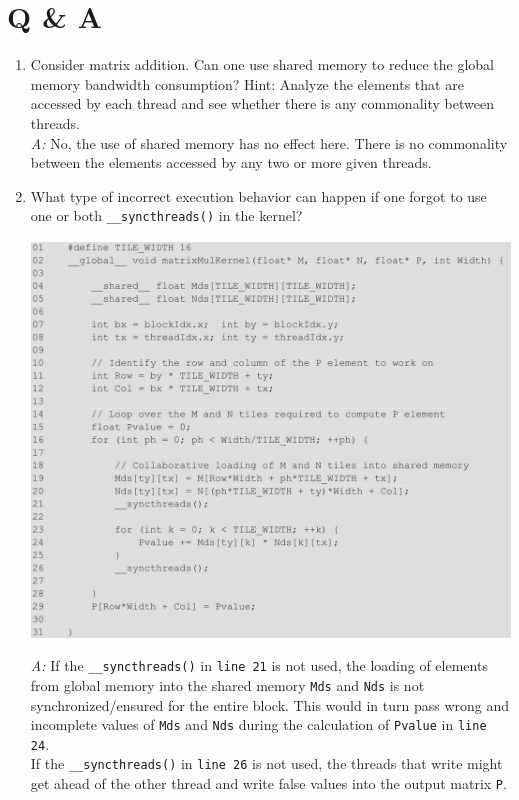 \section{Q \& A}
\begin{enumerate}
      \item Consider matrix addition. Can one use shared memory to reduce the global memory bandwidth consumption? Hint: Analyze the elements that are accessed by each thread and see whether there is any commonality between threads.
            \\ \textsl{A:} No, the use of shared memory has no effect here. There is no commonality between the elements accessed by any two or more given threads.
      \item What type of incorrect execution behavior can happen if one forgot to use one or both \texttt{\_\_syncthreads()} in the kernel?
            \begin{center}
                  \includegraphics[width=0.9\linewidth]{Images/Memories/tiled_kernel.png}
            \end{center}
            \textsl{A:} If the \texttt{\_\_syncthreads()} in \texttt{line 21} is not used, the loading of elements from global memory into the shared memory \texttt{Mds} and \texttt{Nds} is not synchronized/ensured for the entire block. This would in turn pass wrong and incomplete values of \texttt{Mds} and \texttt{Nds} during the calculation of \texttt{Pvalue} in \texttt{line 24}.\\
            If the \texttt{\_\_syncthreads()} in \texttt{line 26} is not used, the threads that write might get ahead of the other thread and write false values into the output matrix \texttt{P}.

\end{enumerate}
